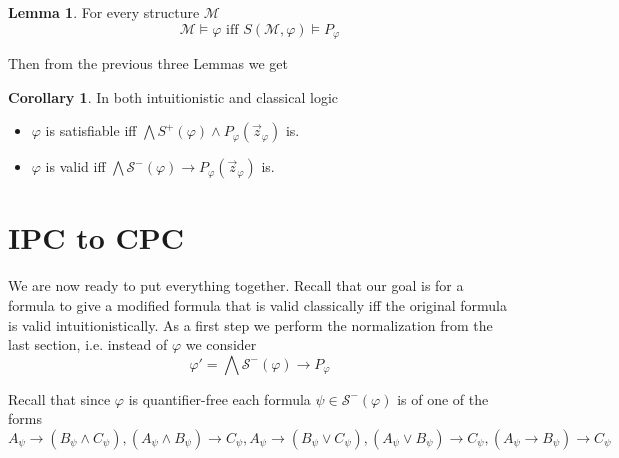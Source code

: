 \documentclass[a4paper,12pt]{report}
\theoremstyle{definition}
\theoremstyle{definition}
\newtheorem{corollary}[theorem]{Corollary}
\theoremstyle{definition}
\newtheorem{lemma}[theorem]{Lemma}
\theoremstyle{definition}
\theoremstyle{definition}
\theoremstyle{definition}
\theoremstyle{definition}
\begin{document}
	\begin{lemma}
		For every structure $\mathcal M$
		$$\mathcal M\models \varphi\text{ iff }S(\mathcal M, \varphi)\models P_\varphi$$
	\end{lemma}
	
	Then from the previous three Lemmas we get
	
	\begin{corollary}\label{equivalid}
		In both intuitionistic and classical logic
		\begin{itemize}
			\item $\varphi$ is satisfiable iff $\mathcal \bigwedge S^+(\varphi)\wedge P_\varphi(\vec z_\varphi)$ is.
			\item $\varphi$ is valid iff $\bigwedge\mathcal S^-(\varphi)\to P_\varphi(\vec z_\varphi)$ is.
		\end{itemize}
	\end{corollary}
	
	\section{IPC to CPC}
	
	We are now ready to put everything together. Recall that our goal is for a formula to give a modified formula that is valid classically iff the original formula is valid intuitionistically. As a first step we perform the normalization from the last section, i.e. instead of $\varphi$ we consider $$\varphi' = \bigwedge \mathcal S^-(\varphi)\to P_\varphi$$
	
	Recall that since $\varphi$ is quantifier-free each formula $\psi\in\mathcal S^-(\varphi)$ is of one of the forms
	$$A_\psi\to (B_\psi\wedge C_\psi), (A_\psi\wedge B_\psi)\to C_\psi, A_\psi\to (B_\psi\vee C_\psi), (A_\psi\vee B_\psi)\to C_\psi, (A_\psi\to B_\psi)\to C_\psi$$
	
\end{document}
